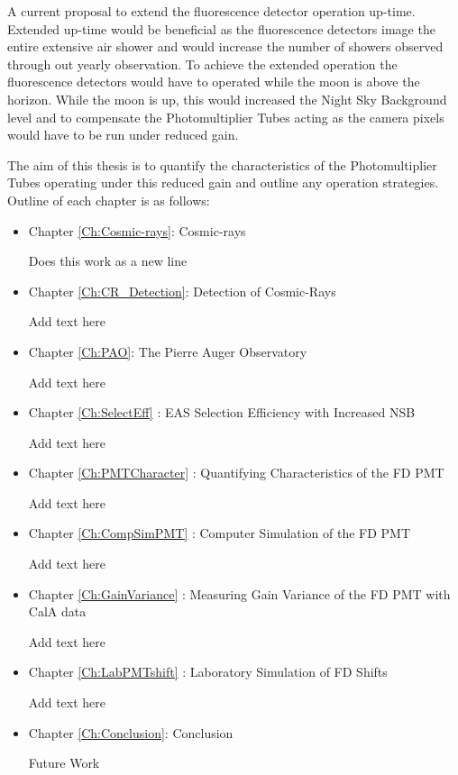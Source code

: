A current proposal to extend the fluorescence detector operation up-time. Extended up-time would be beneficial as the fluorescence detectors image the entire extensive air shower and would increase the number of showers observed through out yearly observation. To achieve the extended operation the fluorescence detectors would have to operated while the moon is above the horizon. While the moon is up, this would increased the Night Sky Background level and to compensate the Photomultiplier Tubes acting as the camera pixels would have to be run under reduced gain. 

The aim of this thesis is to quantify the characteristics of the Photomultiplier Tubes operating under this reduced gain and outline any operation strategies. Outline of each chapter is as follows:

\begin{itemize}
\item  Chapter \ref{Ch:Cosmic-rays}: Cosmic-rays

Does this work as a new line

\item Chapter \ref{Ch:CR_Detection}: Detection of Cosmic-Rays

Add text here

\item Chapter \ref{Ch:PAO}: The Pierre Auger Observatory

Add text here

\item Chapter \ref{Ch:SelectEff} : EAS Selection Efficiency with Increased NSB 

Add text here

\item Chapter \ref{Ch:PMTCharacter} : Quantifying Characteristics of the FD PMT 

Add text here

\item Chapter \ref{Ch:CompSimPMT} : Computer Simulation of the FD PMT 

Add text here

\item Chapter \ref{Ch:GainVariance} : Measuring Gain Variance of the FD PMT with CalA data 

Add text here

\item Chapter \ref{Ch:LabPMTshift} : Laboratory Simulation of FD Shifts

Add text here

\item Chapter \ref{Ch:Conclusion}: Conclusion 

Future Work


\end{itemize}